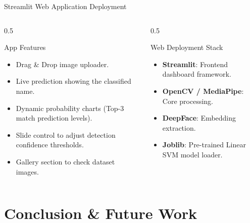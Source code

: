 \documentclass[aspectratio=169]{beamer}
\begin{document}
\begin{frame}{Streamlit Web Application Deployment}
  \begin{columns}
    \begin{column}{0.5\textwidth}
      \begin{block}{App Features}
        \begin{itemize}
          \item Drag \& Drop image uploader.
          \item Live prediction showing the classified name.
          \item Dynamic probability charts (Top-3 match prediction levels).
          \item Slide control to adjust detection confidence thresholds.
          \item Gallery section to check dataset images.
        \end{itemize}
      \end{block}
    \end{column}
    \begin{column}{0.5\textwidth}
      \begin{block}{Web Deployment Stack}
        \begin{itemize}
          \item \textbf{Streamlit}: Frontend dashboard framework.
          \item \textbf{OpenCV / MediaPipe}: Core processing.
          \item \textbf{DeepFace}: Embedding extraction.
          \item \textbf{Joblib}: Pre-trained Linear SVM model loader.
        \end{itemize}
      \end{block}
    \end{column}
  \end{columns}
\end{frame}

\section{Conclusion \& Future Work}
\end{document}
